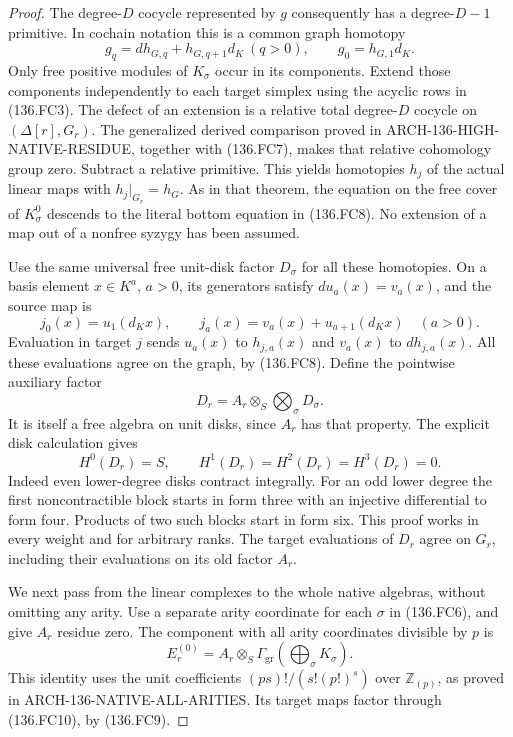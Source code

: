 \begin{proof}
The degree-\(D\) cocycle represented by \(g\) consequently
has a degree-\(D-1\) primitive. In cochain notation this is
a common graph homotopy
\[
 g_q=d h_{G,q}+h_{G,q+1}d_K\ (q>0),\qquad
                            g_0=h_{G,1}d_K.              \tag{136.FC8}
\]
Only free positive modules of \(K_\sigma\) occur in its
components. Extend those components independently to each
target simplex using the acyclic rows in (136.FC3). The defect
of an extension is a relative total degree-\(D\) cocycle
on \((\Delta[r],G_r)\). The generalized derived comparison
proved in ARCH-136-HIGH-NATIVE-RESIDUE, together with (136.FC7),
makes that relative cohomology group zero. Subtract a relative
primitive. This yields homotopies \(h_j\) of the actual
linear maps with \(h_j|_{G_r}=h_G\). As in that theorem,
the equation on the free cover of \(K_\sigma^0\) descends
to the literal bottom equation in (136.FC8). No extension of
a map out of a nonfree syzygy has been assumed.

Use the same universal free unit-disk factor \(D_\sigma\)
for all these homotopies. On a basis element \(x\in K^a\),
\(a>0\), its generators satisfy \(du_a(x)=v_a(x)\), and
the source map is
\[
 j_0(x)=u_1(d_Kx),\qquad
 j_a(x)=v_a(x)+u_{a+1}(d_Kx)\quad(a>0).                   \tag{136.FC9}
\]
Evaluation in target \(j\) sends \(u_a(x)\) to
\(h_{j,a}(x)\) and \(v_a(x)\) to \(d h_{j,a}(x)\).
All these evaluations agree on the graph, by (136.FC8).
Define the pointwise auxiliary factor
\[
                    D_r=A_r\otimes_S\bigotimes_\sigma D_\sigma.
                                                               \tag{136.FC10}
\]
It is itself a free algebra on unit disks, since \(A_r\)
has that property. The explicit disk calculation gives
\[
                   H^0(D_r)=S,\qquad H^1(D_r)=H^2(D_r)
                                            =H^3(D_r)=0. \tag{136.FC11}
\]
Indeed even lower-degree disks contract integrally. For an odd
lower degree the first noncontractible block starts in form three
with an injective differential to form four. Products of two such
blocks start in form six. This proof works in every weight and
for arbitrary ranks. The target evaluations of \(D_r\) agree
on \(G_r\), including their evaluations on its old factor \(A_r\).

We next pass from the linear complexes to the whole native
algebras, without omitting any arity. Use a separate arity coordinate
for each \(\sigma\) in (136.FC6), and give \(A_r\) residue
zero. The component with all arity coordinates divisible by \(p\)
is
\[
                  E_r^{(0)}=A_r\otimes_S
                         \Gamma_{\mathrm{gr}}(\bigoplus_\sigma K_\sigma).
                                                               \tag{136.FC12}
\]
This identity uses the unit coefficients
\((ps)!/(s!(p!)^s)\) over \(\mathbb Z_{(p)}\), as
proved in ARCH-136-NATIVE-ALL-ARITIES. Its target maps factor
through (136.FC10), by (136.FC9).


\end{proof}
